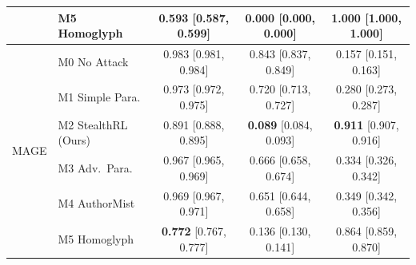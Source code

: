 \begin{tabular}{llccc}
 & M5 Homoglyph & 0.593 [0.587, 0.599] & \textbf{0.000} [0.000, 0.000] & \textbf{1.000} [1.000, 1.000] \\
\midrule
\multirow{6}{*}{MAGE}
 & M0 No Attack & 0.983 [0.981, 0.984] & 0.843 [0.837, 0.849] & 0.157 [0.151, 0.163] \\
 & M1 Simple Para. & 0.973 [0.972, 0.975] & 0.720 [0.713, 0.727] & 0.280 [0.273, 0.287] \\
 & M2 StealthRL (Ours) & 0.891 [0.888, 0.895] & \textbf{0.089} [0.084, 0.093] & \textbf{0.911} [0.907, 0.916] \\
 & M3 Adv.\ Para. & 0.967 [0.965, 0.969] & 0.666 [0.658, 0.674] & 0.334 [0.326, 0.342] \\
 & M4 AuthorMist & 0.969 [0.967, 0.971] & 0.651 [0.644, 0.658] & 0.349 [0.342, 0.356] \\
 & M5 Homoglyph & \textbf{0.772} [0.767, 0.777] & 0.136 [0.130, 0.141] & 0.864 [0.859, 0.870] \\
\bottomrule
\end{tabular}
